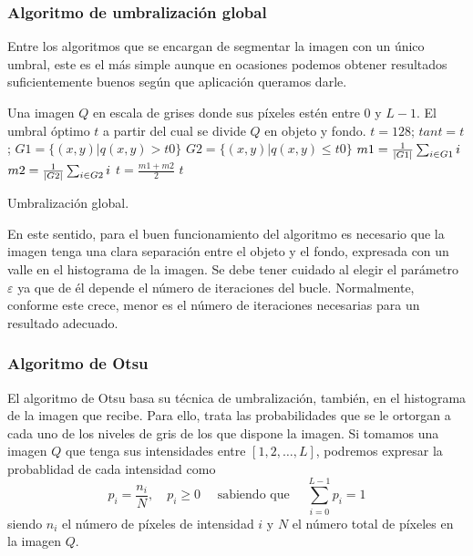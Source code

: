 \subsubsection{Algoritmo de umbralización global}\label{sec:algoritmoglobal}

Entre los algoritmos que se encargan de segmentar la imagen con un único umbral, este es el más simple aunque en ocasiones podemos obtener resultados suficientemente buenos según que aplicación queramos darle.

\begin{algorithm}[!ht]
\begin{algorithmic}[1]
\REQUIRE Una imagen $Q$ en escala de grises donde sus píxeles estén entre $0$ y $L-1$.
\ENSURE El umbral óptimo $t$ a partir del cual se divide $Q$ en objeto y fondo.
\STATE $t = 128$; 
\REPEAT
\STATE $tant = t$;
\STATE $G1 = \{(x, y) | q(x, y) > t0\}$
\STATE $G2 = \{(x, y) | q(x, y) \leq t0\}$
\STATE $m1 = \frac{1}{\left\vert G1\right\vert} \sum_{i\in G1} i$
\STATE $m2 = \frac{1}{\left\vert G2\right\vert} \sum_{i\in G2} i$
\STATE $t = \frac{m1+m2}{2}$
\RETURN $t$
\end{algorithmic}
\caption{Umbralización global.}\label{alg:global}
\end{algorithm}

En este sentido, para el buen funcionamiento del algoritmo es necesario que la imagen tenga una clara separación entre el objeto y el fondo, expresada con un valle en el histograma de la imagen. Se debe tener cuidado al elegir el parámetro $\varepsilon$ ya que de él depende el número de iteraciones del bucle. Normalmente, conforme este crece, menor es el número de iteraciones necesarias para un resultado adecuado.


\subsubsection{Algoritmo de Otsu}\label{sec:algoritmootsu}

El algoritmo de Otsu \cite{art:otsu} basa su técnica de umbralización, también, en el histograma de la imagen que recibe. Para ello, trata las probabilidades que se le ortorgan a cada uno de los niveles de gris de los que dispone la imagen. Si tomamos una imagen $Q$ que tenga sus intensidades entre $[1, 2, \dots, L]$, podremos expresar la probablidad de cada intensidad como
$$p_i = \frac{n_i}{N}, \quad p_i \geq 0\quad\text{ sabiendo que }\quad\sum_{i=0}^{L-1}p_i=1$$
siendo $n_i$ el número de píxeles de intensidad $i$ y $N$ el número total de píxeles en la imagen $Q$.

